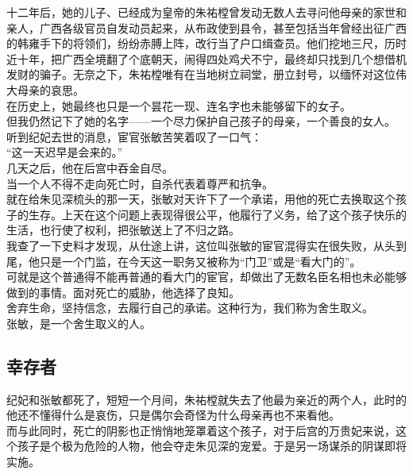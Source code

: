 \begin{multicols}{\theparacolNo}
十二年后，她的儿子、已经成为皇帝的朱祐樘曾发动无数人去寻问他母亲的家世和亲人，广西各级官员自发动员起来，从布政使到县令，甚至包括当年曾经出征广西的韩雍手下的将领们，纷纷赤膊上阵，改行当了户口缉查员。他们挖地三尺，历时近十年，把广西全境翻了个底朝天，闹得四处鸡犬不宁，最终却只找到几个想借机发财的骗子。无奈之下，朱祐樘唯有在当地树立祠堂，册立封号，以缅怀对这位伟大母亲的哀思。\\

在历史上，她最终也只是一个昙花一现、连名字也未能够留下的女子。\\

但我仍然记下了她的名字——一个尽力保护自己孩子的母亲，一个善良的女人。\\

听到纪妃去世的消息，宦官张敏苦笑着叹了一口气：\\

“这一天迟早是会来的。”\\

几天之后，他在后宫中吞金自尽。\\

当一个人不得不走向死亡时，自杀代表着尊严和抗争。\\

就在给朱见深梳头的那一天，张敏对天许下了一个承诺，用他的死亡去换取这个孩子的生存。上天在这个问题上表现得很公平，他履行了义务，给了这个孩子快乐的生活，也行使了权利，把张敏送上了不归之路。\\

我查了一下史料才发现，从仕途上讲，这位叫张敏的宦官混得实在很失败，从头到尾，他只是一个门监，在今天这一职务又被称为“门卫”或是“看大门的”。\\

可就是这个普通得不能再普通的看大门的宦官，却做出了无数名臣名相也未必能够做到的事情。面对死亡的威胁，他选择了良知。\\

舍弃生命，坚持信念，去履行自己的承诺。这种行为，我们称为舍生取义。\\

张敏，是一个舍生取义的人。\\

\subsection{幸存者}
纪妃和张敏都死了，短短一个月间，朱祐樘就失去了他最为亲近的两个人，此时的他还不懂得什么是哀伤，只是偶尔会奇怪为什么母亲再也不来看他。\\

而与此同时，死亡的阴影也正悄悄地笼罩着这个孩子，对于后宫的万贵妃来说，这个孩子是个极为危险的人物，他会夺走朱见深的宠爱。于是另一场谋杀的阴谋即将实施。\\


\end{multicols}
